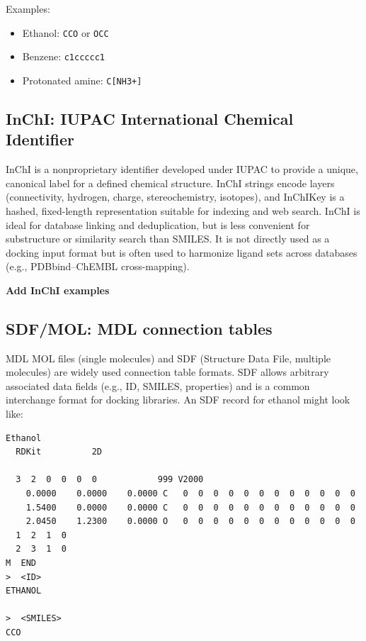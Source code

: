 \documentclass[12pt, a4paper]{article}
\begin{document}
Examples:
\begin{itemize}
  \item Ethanol: \verb|CCO| or \verb|OCC|
  \item Benzene: \verb|c1ccccc1|
  \item Protonated amine: \verb|C[NH3+]|
\end{itemize} 

\subsection{InChI: IUPAC International Chemical Identifier}

InChI is a nonproprietary identifier developed under IUPAC to provide a unique, canonical label for a defined chemical structure.\cite{CH6_Heller2013,CH6_McNaught2006,CH6_heller2009iupac} InChI strings encode layers (connectivity, hydrogen, charge, stereochemistry, isotopes), and InChIKey is a hashed, fixed-length representation suitable for indexing and web search. InChI is ideal for database linking and deduplication, but is less convenient for substructure or similarity search than SMILES. It is not directly used as a docking input format but is often used to harmonize ligand sets across databases (e.g., PDBbind–ChEMBL cross-mapping).

\textbf{Add InChI examples}

\subsection{SDF/MOL: MDL connection tables}

MDL MOL files (single molecules) and SDF (Structure Data File, multiple molecules) are widely used connection table formats.  SDF allows arbitrary associated data fields (e.g., ID, SMILES, properties) and is a common interchange format for docking libraries. An SDF record for ethanol might look like:

\begin{verbatim}
Ethanol
  RDKit          2D

  3  2  0  0  0  0            999 V2000
    0.0000    0.0000    0.0000 C   0  0  0  0  0  0  0  0  0  0  0  0
    1.5400    0.0000    0.0000 C   0  0  0  0  0  0  0  0  0  0  0  0
    2.0450    1.2300    0.0000 O   0  0  0  0  0  0  0  0  0  0  0  0
  1  2  1  0
  2  3  1  0
M  END
>  <ID>
ETHANOL

>  <SMILES>
CCO

\end{verbatim}
\end{document}

